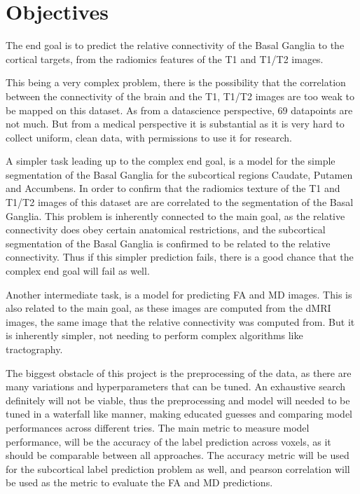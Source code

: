 \section{Objectives}

The end goal is to predict the relative connectivity of the Basal Ganglia to the cortical targets, from the radiomics features of the T1 and T1/T2 images.\par

This being a very complex problem, there is the possibility that the correlation between the connectivity of the brain and the T1, T1/T2 images are too weak to be mapped on this dataset. As from a datascience perspective, 69 datapoints are not much. But from a medical perspective it is substantial as it is very hard to collect uniform, clean data, with permissions to use it for research.\par

A simpler task leading up to the complex end goal, is a model for the simple segmentation of the Basal Ganglia for the subcortical regions Caudate, Putamen and Accumbens. In order to confirm that the radiomics texture of the T1 and T1/T2 images of this dataset are are correlated to the segmentation of the Basal Ganglia. This problem is inherently connected to the main goal, as the relative connectivity does obey certain anatomical restrictions, and the subcortical segmentation of the Basal Ganglia is confirmed to be related to the relative connectivity. Thus if this simpler prediction fails, there is a good chance that the complex end goal will fail as well.\par

Another intermediate task, is a model for predicting \ac{FA} and \ac{MD} images. This is also related to the main goal, as these images are computed from the \ac{dMRI} images, the same image that the relative connectivity was computed from. But it is inherently simpler, not needing to perform complex algorithms like tractography.\par

The biggest obstacle of this project is the preprocessing of the data, as there are many variations and hyperparameters that can be tuned. An exhaustive search definitely will not be viable, thus the preprocessing and model will needed to be tuned in a waterfall like manner, making educated guesses and comparing model performances across different tries. The main metric to measure model performance, will be the accuracy of the label prediction across voxels, as it should be comparable between all approaches. The accuracy metric will be used for the subcortical label prediction problem as well, and pearson correlation will be used as the metric to evaluate the \ac{FA} and \ac{MD} predictions.

